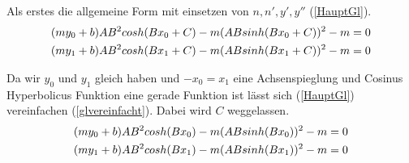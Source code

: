 Als erstes die allgemeine Form mit einsetzen von $n,n',y',y''$ (\eqref{HauptGl}).
\begin{align}
	(my_0+b)A B^2 cosh(B x_0 + C)-m (A B sinh(B x_0 + C))^2-m &= 0\notag \\
	(my_1+b)A B^2 cosh(B x_1 + C)-m (A B sinh(B x_1 + C))^2-m &=0 \label{HauptGl}
\end{align}

Da wir $y_0$ und $y_1$ gleich haben und $-x_0=x_1$ eine Achsenspieglung und Cosinus Hyperbolicus Funktion eine gerade Funktion ist lässt sich (\eqref{HauptGl}) vereinfachen (\eqref{glvereinfacht}). Dabei wird $C$ weggelassen.
\begin{align}
	(my_0+b)A B^2 cosh(B x_0 )-m (A B sinh(B x_0 ))^2-m &= 0\notag \\
	(my_1+b)A B^2 cosh(B x_1 )-m (A B sinh(B x_1 ))^2-m &=0 \label{glvereinfacht}
\end{align}

